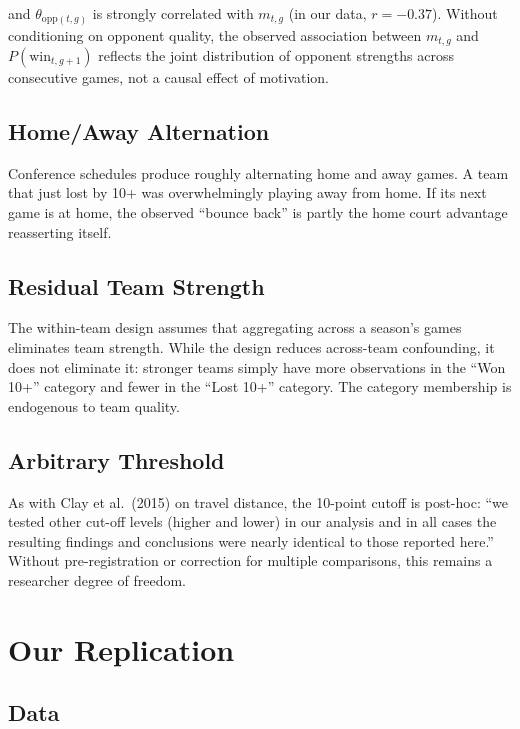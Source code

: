\documentclass[11pt]{article}
\begin{document}
\noindent and $\theta_{\text{opp}(t,g)}$ is strongly correlated with $m_{t,g}$ (in our data, $r = -0.37$). Without conditioning on opponent quality, the observed association between $m_{t,g}$ and $P(\text{win}_{t,g+1})$ reflects the joint distribution of opponent strengths across consecutive games, not a causal effect of motivation.

\subsection{Home/Away Alternation}

Conference schedules produce roughly alternating home and away games. A team that just lost by 10+ was overwhelmingly playing away from home. If its next game is at home, the observed ``bounce back'' is partly the home court advantage reasserting itself.

\subsection{Residual Team Strength}

The within-team design assumes that aggregating across a season's games eliminates team strength. While the design reduces across-team confounding, it does not eliminate it: stronger teams simply have more observations in the ``Won 10+'' category and fewer in the ``Lost 10+'' category. The category membership is endogenous to team quality.

\subsection{Arbitrary Threshold}

As with Clay et al.\ (2015) on travel distance, the 10-point cutoff is post-hoc: ``we tested other cut-off levels (higher and lower) in our analysis and in all cases the resulting findings and conclusions were nearly identical to those reported here.'' Without pre-registration or correction for multiple comparisons, this remains a researcher degree of freedom.

\section{Our Replication}

\subsection{Data}
\end{document}
